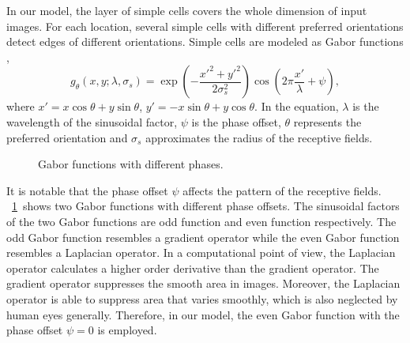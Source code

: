 \documentclass[10pt]{article}
\begin{document}
In our model, the layer of simple cells covers the whole dimension of input images.
For each location, several simple cells with different preferred orientations 
detect edges of different orientations.
Simple cells are modeled as Gabor functions \cite{gabor1946},
\begin{equation}\label{equ:gabor}
g_{\theta}(x,y;\lambda,\sigma_s)
=\exp \left(-\frac{x'^2+y'^2}{2\sigma_s^2}\right)
\cos \left(2\pi\frac{x'}{\lambda}+\psi\right),
\end{equation}
where $x'=x\cos\theta+y\sin\theta$, $y'=-x\sin\theta+y\cos\theta$.
In the equation, $\lambda$ is the wavelength of the sinusoidal factor, 
$\psi$ is the phase offset, 
$\theta$ represents the preferred orientation and 
$\sigma_s$ approximates the radius of the receptive fields.

\begin{figure}
\centering
{}
\caption{Gabor functions with different phases.}
\label{fig:4}
\end{figure}

It is notable that the phase offset $\psi$ affects the pattern of the receptive fields.
\figurename~\ref{fig:4}~shows two Gabor functions with different phase offsets.
The sinusoidal factors of the two Gabor functions 
are odd function and even function respectively.
The odd Gabor function resembles a gradient operator
while the even Gabor function resembles a Laplacian operator.
In a computational point of view, 
the Laplacian operator calculates a higher order derivative 
than the gradient operator.
The gradient operator suppresses the smooth area in images.
Moreover, the Laplacian operator is able 
to suppress area that varies smoothly, 
which is also neglected by human eyes generally.
Therefore, in our model, the even Gabor function 
with the phase offset $\psi=0$ is employed.
\end{document}
